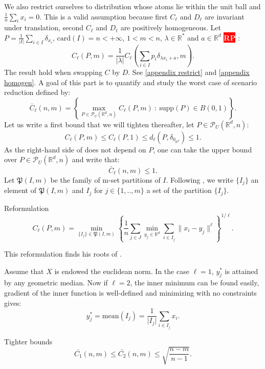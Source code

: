 \documentclass{amsart}
\newcommand{\nb}[3]{
		{\colorbox{#2}{\bfseries\sffamily\tiny\textcolor{white}{#1}}}
		{\textcolor{#2}{\text{$\blacktriangleright$}{\textcolor{#2}{#3}}\text{$\blacktriangleleft$}}}}
\newcommand{\rp}[1]{\nb{RP}{red}{#1}}
\newcommand{\RR}{\mathbb{R}}
\begin{document}
We also restrict ourselves to distribution whose atoms lie within the unit ball and $\frac{1}{n}\sum_ix_i=0$. This is a valid assumption because first $C_\ell$ and $D_\ell$ are invariant under translation, second $C_\ell$ and $D_\ell$ are positively homogeneous. Let $P=\frac{1}{\lvert I\rvert}\sum_{i\in I}\delta_{x_i}$, $\text{card}\left(I\right)=n<+\infty$, $1<m<n$, $\lambda\in\RR^*$ and $a\in\RR^d$ \rp{faire une appendice}:
$$ 
C_\ell\left(P,m\right)=\frac{1}{\lvert\lambda\rvert} C_\ell\left(\sum_{i\in I}p_i\delta_{\lambda x_i+a},m\right).
$$
The result hold when swapping $C$ by $D$. See \ref{appendix restrict} and \ref{appendix homogen}. A goal of this part is to quantify and study the worst case of scenario reduction defined by:
$$    \bar{C}_\ell\left(n,m \right)=\left\{\max_{P\in\mathcal{P}_U(\mathbb{R}^d,n)}C_\ell(P,m)\: :\: \text{supp}(P)\in B(0,1)\right\}.
$$
Let us write a first bound that we will tighten thereafter, let $P\in\mathcal{P}_U(\mathbb{R}^d,n)$:
\begin{equation}\label{easy bound}C_\ell\left(P,m\right)\leq C_\ell\left(P,1\right)\leq d_\ell\left(P,\delta_{0_{\RR^d}}\right)\leq 1.\end{equation}
As the right-hand side of  does not depend on $P$, one can take the upper bound over $P\in\mathcal{P}_U\left(\RR^d,n\right)$ and write that:
$$
\bar{C}_\ell\left(n,m \right)\leq1.
$$
Let $\mathfrak{P}(I,m)$ be the family of m-set partitions of $I$. Following \cite{rujeerapaiboon_scenario_2022}, we write $\{I_j\}$ an element of $\mathfrak{P}(I,m)$ and $I_j$ for $j\in\{1,..,m\}$ a set of the partition $\{I_j\}$.
\begin{theorem}{Reformulation}\label{theorem1}
$$C_\ell(P,m)=\min_{\{I_j\}\in \mathfrak{P}(I,m)}\left\{ \frac{1}{n}\sum_{j\in J}\min_{y_j\in\mathbb{R}^d}\sum_{i\in I_j}\lVert x_i-y_j\rVert^\ell \right\}^{1/\ell}.$$
\end{theorem}
\begin{remark}
    This reformulation finds his roots of .
\end{remark}
Assume that $X$ is endowed the euclidean norm. In the case $\ell=1$, $y_j^*$ is attained by any geometric median. Now if $\ell=2$, the inner minimum can be found easily, gradient of the inner function is well-defined and minimizing with  no constraints gives: $$y_j^*=\text{mean}\left(I_j\right)=\frac{1}{\lvert I_j\rvert}{\sum_{i\in I_j}x_i}.$$ 
\begin{proposition}{Tighter bounds}
$$\bar{C_1}\left(n,m\right)\leq\bar{C_2}\left(n,m\right)\leq\sqrt{\frac{n-m}{n-1}}.$$
\end{proposition}
\end{document}
